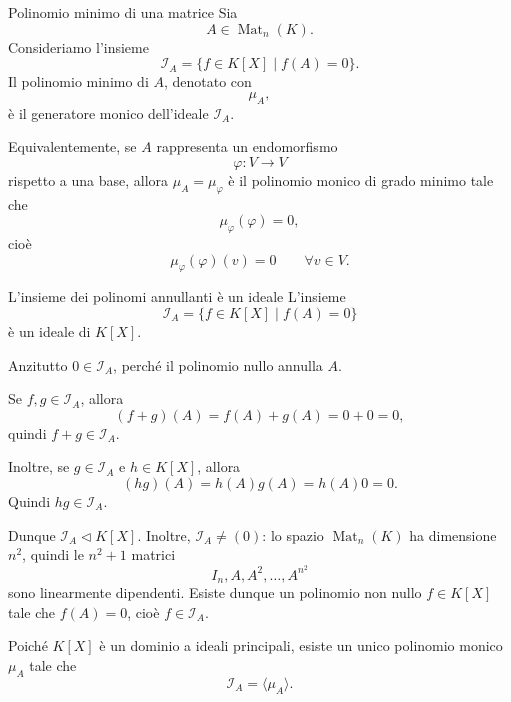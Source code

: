 \documentclass[a4paper]{article}
\begin{document}
\begin{radioactive}
\begin{snippetdefinition}{Polinomio minimo di una matrice}
    Sia
    \[
        A\in \operatorname{Mat}_n(K).
    \]
    Consideriamo l'insieme
    \[
        \mathcal{I}_A
        =
        \{f\in K[X]\mid f(A)=0\}.
    \]
    Il polinomio minimo di \(A\), denotato con
    \[
        \mu_A,
    \]
    è il generatore monico dell'ideale \(\mathcal{I}_A\).

    Equivalentemente, se \(A\) rappresenta un endomorfismo
    \[
        \varphi\colon V\to V
    \]
    rispetto a una base, allora \(\mu_A=\mu_\varphi\) è il polinomio monico di grado minimo tale che
    \[
        \mu_\varphi(\varphi)=0,
    \]
    cioè
    \[
        \mu_\varphi(\varphi)(v)=0
        \qquad
        \forall v\in V.
    \]
\end{snippetdefinition}
\end{radioactive}

\begin{radioactive}
\begin{snippetproposition}{L'insieme dei polinomi annullanti è un ideale}
    L'insieme
    \[
        \mathcal{I}_A=\{f\in K[X]\mid f(A)=0\}
    \]
    è un ideale di \(K[X]\).
\end{snippetproposition}
\end{radioactive}

\begin{radioactive}
\begin{snippetproof}{}
    Anzitutto \(0\in \mathcal{I}_A\), perché il polinomio nullo annulla \(A\).

    Se \(f,g\in \mathcal{I}_A\), allora
    \[
        (f+g)(A)=f(A)+g(A)=0+0=0,
    \]
    quindi \(f+g\in \mathcal{I}_A\).

    Inoltre, se \(g\in\mathcal{I}_A\) e \(h\in K[X]\), allora
    \[
        (hg)(A)=h(A)g(A)=h(A)0=0.
    \]
    Quindi \(hg\in \mathcal{I}_A\).

    Dunque \(\mathcal{I}_A\triangleleft K[X]\). Inoltre,
    \(\mathcal{I}_A\neq(0)\): lo spazio
    \(\operatorname{Mat}_n(K)\) ha dimensione \(n^2\), quindi le
    \(n^2+1\) matrici
    \[
        I_n,A,A^2,\ldots,A^{n^2}
    \]
    sono linearmente dipendenti. Esiste dunque un polinomio non nullo
    \(f\in K[X]\) tale che \(f(A)=0\), cioè
    \(f\in\mathcal{I}_A\).

    Poiché \(K[X]\) è un dominio a ideali principali, esiste un unico
    polinomio monico \(\mu_A\) tale che
    \[
        \mathcal{I}_A=\langle \mu_A \rangle.
    \]
\end{snippetproof}
\end{radioactive}
\end{document}
